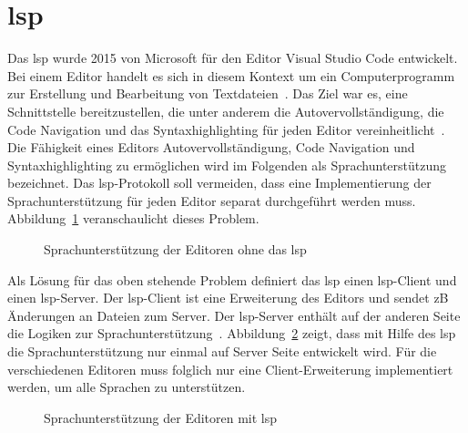 \section{\acs{lsp}}

Das \ac{lsp} wurde 2015 von Microsoft für den Editor Visual Studio Code entwickelt.
Bei einem Editor handelt es sich in diesem Kontext um ein Computerprogramm zur Erstellung und Bearbeitung von Textdateien~\cite{editor-definition}.
Das Ziel war es, eine Schnittstelle bereitzustellen, die unter anderem die Autovervollständigung, die Code Navigation und das Syntaxhighlighting
für jeden Editor vereinheitlicht~\cite{lsp-witekio}.
Die Fähigkeit eines Editors Autovervollständigung, Code Navigation und Syntaxhighlighting zu ermöglichen wird im Folgenden als Sprachunterstützung bezeichnet.
Das \ac{lsp}-Protokoll soll vermeiden, dass eine Implementierung der Sprachunterstützung für jeden Editor separat durchgeführt werden muss.
Abbildung~\ref{fig:without-lsp} veranschaulicht dieses Problem.

\begin{figure}[htp] %
      \centering
      \caption{Sprachunterstützung der Editoren ohne das \acs{lsp}}
      \label{fig:without-lsp}
\end{figure}

Als Lösung für das oben stehende Problem definiert das \ac{lsp} einen \ac{lsp}-Client und einen \ac{lsp}-Server.
Der \ac{lsp}-Client ist eine Erweiterung des Editors und sendet \ac{zB} Änderungen an Dateien zum Server.
Der \ac{lsp}-Server enthält auf der anderen Seite die Logiken zur Sprachunterstützung~\cite{lsp-witekio}.
Abbildung~\ref{fig:with-lsp} zeigt, dass mit Hilfe des \ac{lsp} die Sprachunterstützung nur einmal auf Server Seite entwickelt wird.
Für die verschiedenen Editoren muss folglich nur eine Client-Erweiterung implementiert werden, um alle Sprachen zu unterstützen.

\begin{figure}[htp] %
      \centering
      \caption{Sprachunterstützung der Editoren mit \acs{lsp}}
      \label{fig:with-lsp}
\end{figure}


